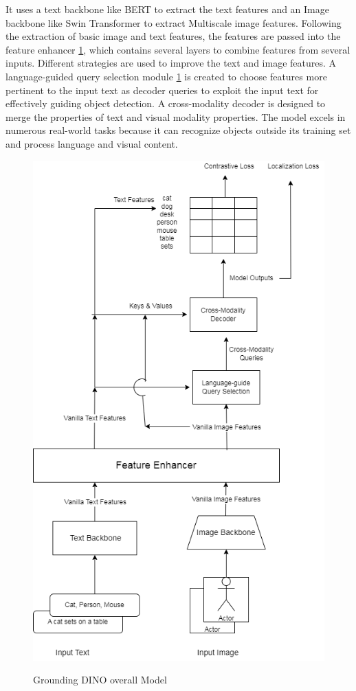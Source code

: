 It uses a text backbone like BERT to extract the text features and an Image backbone like Swin Transformer to extract Multiscale image features. Following the extraction of basic image and text features, the features are passed into the feature enhancer \ref{fig:DINO}, which contains several layers to combine features from several inputs. Different strategies are used to improve the text and image features.
A language-guided query selection module \ref{fig:DINO} is created to choose features more pertinent to the input text as decoder queries to exploit the input text for effectively guiding object detection. A cross-modality decoder is designed to merge the properties of text and visual modality properties. The model excels in numerous real-world tasks because it can recognize objects outside its training set and process language and visual content\cite{Ahmad_2023}.
\begin{figure}[h]
\centering
	\includegraphics*[width = 13cm]{images/DINO.png}
	 \caption{Grounding DINO overall Model}\cite{GroundingDINO}
	\label{fig:DINO}
\end{figure}

